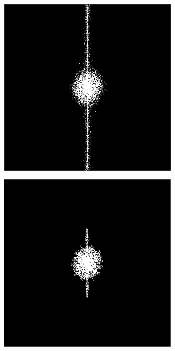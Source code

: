 \documentclass{article}
\begin{document}
\begin{figure}[!htb]
\begin{subfigure}[b]{0.24\textwidth}
                \caption{}
                \label{fig:gull2}
        \end{subfigure}%
        \hspace{\fill}
        \begin{subfigure}[b]{0.24\textwidth}
                \includegraphics[width=\linewidth]{step3}
                \caption{}
                \label{fig:tiger}
        \end{subfigure}%
        \hspace{\fill}
        \begin{subfigure}[b]{0.24\textwidth}
                \includegraphics[width=\linewidth]{step4}

\end{subfigure}
\end{figure}
\end{document}
